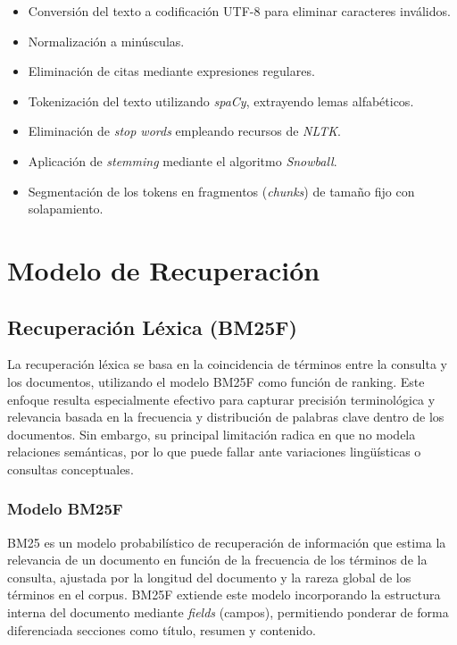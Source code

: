 \documentclass[runningheads]{llncs}
\begin{document}
\begin{itemize}
    \item Conversión del texto a codificación UTF-8 para eliminar caracteres inválidos.
    \item Normalización a minúsculas.
    \item Eliminación de citas mediante expresiones regulares.
    \item Tokenización del texto utilizando \textit{spaCy}, extrayendo lemas alfabéticos.
    \item Eliminación de \textit{stop words} empleando recursos de \textit{NLTK}.
    \item Aplicación de \textit{stemming} mediante el algoritmo \textit{Snowball}.
    \item Segmentación de los tokens en fragmentos (\textit{chunks}) de tamaño fijo con solapamiento.
\end{itemize}

\section{Modelo de Recuperación}

\subsection{Recuperación Léxica (BM25F)}

La recuperación léxica se basa en la coincidencia de términos entre la consulta y los documentos, 
utilizando el modelo BM25F como función de ranking. 
Este enfoque resulta especialmente efectivo para capturar precisión terminológica y 
relevancia basada en la frecuencia y distribución de palabras clave dentro de los documentos. 
Sin embargo, su principal limitación radica en que no modela relaciones semánticas, 
por lo que puede fallar ante variaciones lingüísticas o consultas conceptuales.

\subsubsection{Modelo BM25F}

BM25 es un modelo probabilístico de recuperación de información que estima la relevancia de un documento en función de la frecuencia de los términos de la consulta, 
ajustada por la longitud del documento y la rareza global de los términos en el corpus. 
BM25F extiende este modelo incorporando la estructura interna del documento mediante \textit{fields} (campos), 
permitiendo ponderar de forma diferenciada secciones como título, resumen y contenido.
\end{document}
